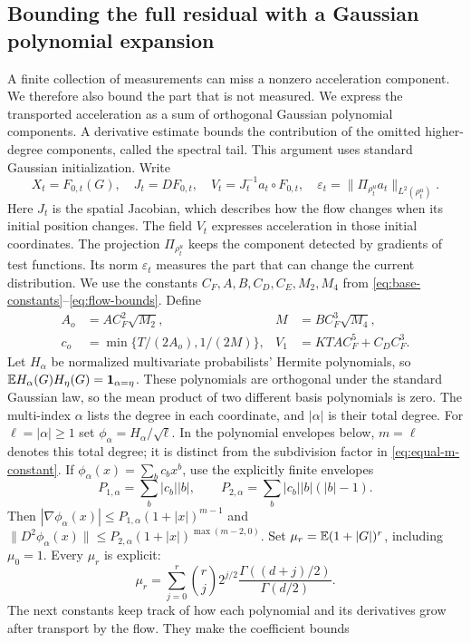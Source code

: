 \subsection{Bounding the full residual with a Gaussian polynomial expansion}
A finite collection of measurements can miss a nonzero acceleration
component. We therefore also bound the part that is not measured.
We express the transported acceleration as a sum of orthogonal Gaussian
polynomial components. A derivative estimate bounds the contribution of
the omitted higher-degree components, called the spectral tail.
This argument uses standard Gaussian initialization. Write
\[
 X_t=F_{0,t}(G),\quad J_t=DF_{0,t},\quad
 V_t=J_t^{-1}a_t\circ F_{0,t},\quad
 \varepsilon_t=\|\Pi_{\rho_t^u}a_t\|_{L^2(\rho_t^u)}.
\]
Here $J_t$ is the spatial Jacobian, which describes how the flow changes
when its initial position changes. The field $V_t$ expresses acceleration
in those initial coordinates. The projection $\Pi_{\rho_t^u}$ keeps the
component detected by gradients of test functions. Its norm $\varepsilon_t$
measures the part that can change the current distribution.
We use the constants $C_F,A,B,C_D,C_E,M_2,M_4$ from
\eqref{eq:base-constants}--\eqref{eq:flow-bounds}. Define
\begin{align}
 A_o&=AC_F^2\sqrt{M_2},&M&=BC_F^3\sqrt{M_4},\\
 c_o&=\min\{T/(2A_o),1/(2M)\},&
 V_1&=KTAC_F^5+C_D C_F^3. \label{eq:spectral-core}
\end{align}
Let $H_\alpha$ be normalized multivariate probabilists' Hermite polynomials,
so $\mathbb E H_\alpha(G)H_\eta(G)=\mathbf1_{\alpha=\eta}$. These polynomials are
orthogonal under the standard Gaussian law, so the mean product of two
different basis polynomials is zero. The multi-index $\alpha$ lists the
degree in each coordinate, and $|\alpha|$ is their total degree.
For $\ell=|\alpha|\ge1$ set $\phi_\alpha=H_\alpha/\sqrt \ell$.
In the polynomial envelopes below, $m=\ell$ denotes this total degree;
it is distinct from the subdivision factor in \eqref{eq:equal-m-constant}.
If
$\phi_\alpha(x)=\sum_b c_bx^b$, use the explicitly finite envelopes
\[
 P_{1,\alpha}=\sum_b|c_b||b|,\qquad
 P_{2,\alpha}=\sum_b|c_b||b|(|b|-1).
\]
Then $|\nabla\phi_\alpha(x)|\le P_{1,\alpha}(1+|x|)^{m-1}$ and
$\|D^2\phi_\alpha(x)\|\le P_{2,\alpha}(1+|x|)^{\max(m-2,0)}$.
Set $\mu_r=\mathbb E(1+|G|)^r$, including $\mu_0=1$. Every $\mu_r$ is explicit:
\[
 \mu_r=\sum_{j=0}^r\binom{r}{j}2^{j/2}
       \frac{\Gamma((d+j)/2)}{\Gamma(d/2)}.
\]
The next constants keep track of how each polynomial and its derivatives
grow after transport by the flow. They make the coefficient bounds
